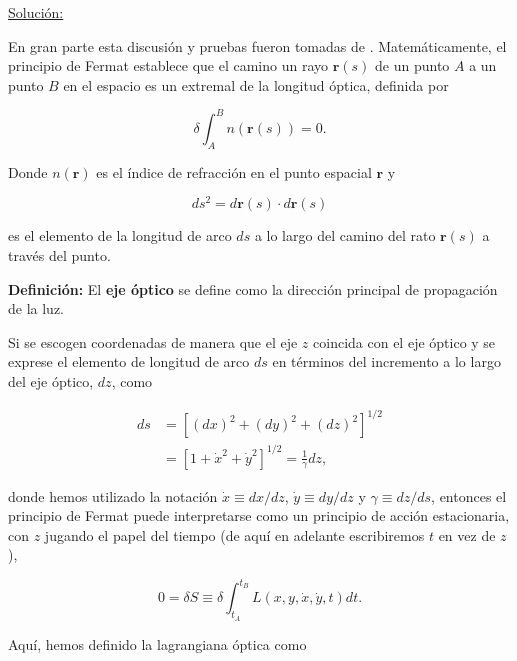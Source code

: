 \documentclass[a4paper,10pt]{article}
\numberwithin{equation}{section}
\newcommand{\definicion}{\textbf{Definición: }}
\begin{document}
\underline{Solución:} \vspace{.3cm}

En gran parte esta discusión y pruebas fueron tomadas de \cite{holm}. Matemáticamente, el principio de Fermat establece que el camino un rayo $\mathbf{r}(s)$ 
de un punto $A$ a un punto $B$ en el espacio es un extremal de la longitud óptica, 
definida por 

\begin{equation}
 \delta \int_A^B n(\mathbf{r}(s)) = 0.
\end{equation}

Donde $n(\mathbf{r})$ es el índice de refracción en el punto espacial $\mathbf{r}$ 
y 

\begin{equation}
 ds^2 = d\mathbf{r}(s) \cdot d\mathbf{r}(s)
\end{equation}

es el elemento de la longitud de arco $ds$ a lo largo del camino del rato $\mathbf{r}(s)$ 
a través del punto.

\vspace{.3cm}

\definicion El \textbf{eje óptico} se define como la dirección principal de propagación de la 
luz. 

\vspace{.3cm}

Si se escogen coordenadas de manera que el eje $z$ coincida con el eje óptico y 
se exprese el elemento de longitud de arco $ds$ en términos del incremento a lo 
largo del eje óptico, $dz$, como 

\begin{align*}
 ds &= \left[(dx)^2 + (dy)^2 + (dz)^2 \right]^{1/2}\\
    &= \left[1 + \dot{x}^2 + \dot{y}^2 \right]^{1/2} = \frac{1}{\gamma}dz,
\end{align*}

donde hemos utilizado la notación $\dot{x} \equiv dx/dz$, $\dot{y} \equiv dy/dz$ y 
$\gamma \equiv dz/ds$, entonces el principio de Fermat puede interpretarse como 
un principio de acción estacionaria, con $z$ jugando el papel del tiempo (de aquí 
en adelante escribiremos $t$ en vez de $z$),

\begin{equation}
 0 = \delta S \equiv \delta \int_{t_A}^{t_B} L(x,y,\dot{x},\dot{y},t)dt.
 \label{eq:112}
\end{equation}

Aquí, hemos definido la lagrangiana óptica como 
\end{document}
